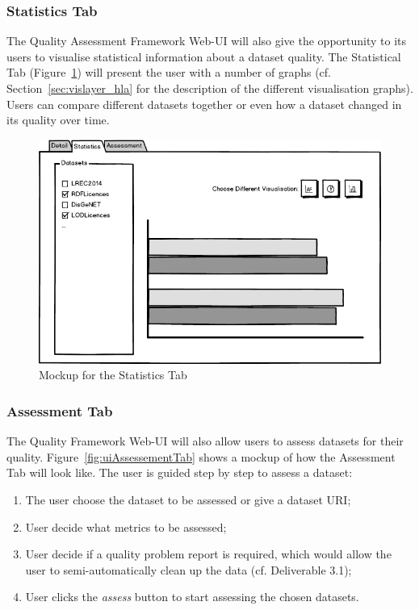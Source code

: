 \subsubsection{Statistics Tab}
The Quality Assessment Framework Web-UI will also give the opportunity to its users to visualise statistical information about a dataset quality.
The Statistical Tab (Figure~\ref{fig:uiStatisticsTab}) will present the user with a number of graphs (cf. Section~\ref{sec:vislayer_hla} for the description of the different visualisation graphs).
Users can compare different datasets together or even how a dataset changed in its quality over time.

\begin{figure}[tbph]
\center
\includegraphics[width=\textwidth]{images/uiStatisticsTab.png} 
\caption{Mockup for the Statistics Tab} 
\label{fig:uiStatisticsTab}
\end{figure}

\subsubsection{Assessment Tab}
The Quality Framework Web-UI will also allow users to assess datasets for their quality.
Figure~\ref{fig:uiAssessementTab} shows a mockup of how the Assessment Tab will look like.
The user is guided step by step to assess a dataset:
\begin{enumerate}
\item The user choose the dataset to be assessed or give a dataset URI;
\item User decide what metrics to be assessed;
\item User decide if a quality problem report is required, which would allow the user to semi-automatically clean up the data (cf. Deliverable 3.1);
\item User clicks the \emph{assess} button to start assessing the chosen datasets.
\end{enumerate}

